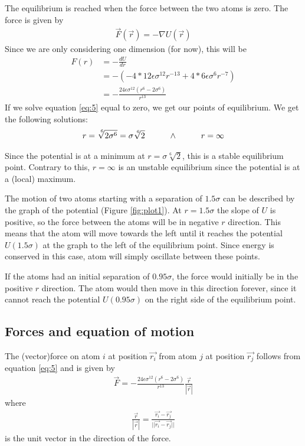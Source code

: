 \documentclass[a4paper,10pt,english]{article}
\begin{document}
\newpage
The equilibrium is reached when the force between the two atoms is zero. The force is given by
\begin{align}
    \Vec{F}(\Vec{r}) = - \nabla U(\Vec{r})
\end{align}
Since we are only considering one dimension (for now), this will be
\begin{align}
    F(r) &= - \frac{dU}{dr} \\
    &= -(-4*12\epsilon\sigma^{12}r^{-13} + 4*6\epsilon\sigma^{6}r^{-7}) \\
    &= -\frac{24\epsilon\sigma^{12}(r^6-2\sigma^6)}{r^{13}} \label{eq:5}
\end{align}
If we solve equation \ref{eq:5} equal to zero, we get our points of equilibrium. We get the following solutions:
\begin{align*}
    r 
    = \sqrt[\leftroot{-2}\uproot{2}6]{2\sigma^6} 
    = \sigma \sqrt[\leftroot{-2}\uproot{2}6]{2} 
    \hspace{1cm} \land \hspace{1cm}
    r
    =\infty
\end{align*}

Since the potential is at a minimum at $ r = \sigma \sqrt[6]{2} $, this is a stable equilibrium point. Contrary to this, $ r = \infty $ is an unstable equilibrium since the potential is at a (local) maximum.

The motion of two atoms starting with a separation of $1.5\sigma$ can be described by the graph of the potential (Figure \ref{fig:plot1}). At $r=1.5\sigma$ the slope of $U$ is positive, so the force between the atoms will be in negative $r$ direction. This means that the atom will move towards the left until it reaches the potential $U(1.5\sigma)$ at the graph to the left of the equilibrium point.  Since energy is conserved in this case, atom will simply oscillate between these points.

If the atoms had an initial separation of $0.95\sigma$, the force would initially be in the positive $r$ direction. The atom would then move in this direction forever, since it cannot reach the potential $U(0.95\sigma)$ on the right side of the equilibrium point.

\subsection{Forces and equation of motion} \label{1b}

The (vector)force on atom $i$ at position $\Vec{r_i}$ from atom $j$ at position $\Vec{r_j}$ follows from equation \ref{eq:5} and is given by
\begin{align} \label{eq:6}
    \Vec{F}
    = - \frac{24\epsilon\sigma^{12}(r^6-2\sigma^6)}{r^{13}} \frac{\Vec{r}}{|\Vec{r}|}
\end{align} 
where 
\begin{align*}
    \frac{\Vec{r}}{|\Vec{r}|} = \frac{\Vec{r_i} - \Vec{r_j}}{||\Vec{r_i} - \Vec{r_j}||}
\end{align*}
is the unit vector in the direction of the force. 
\end{document}
